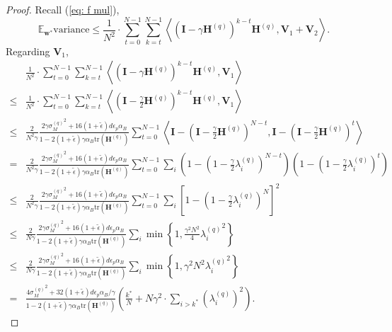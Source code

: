 \documentclass[11pt, letterpaper]{article}
\begin{document}
\begin{proof}
    Recall (\ref{eq: f mul}),
    \begin{equation*}
        \mathbb{E}_{\mathbf{w}^*}\mathrm{variance}\leq\frac{1}{N^2}\cdot\sum_{t=0}^{N-1}\sum_{k=t}^{N-1}\left\langle(\mathbf{I}-\gamma\mathbf{H}^{(q)})^{k-t}\mathbf{H}^{(q)},\mathbf{V}_1+\mathbf{V}_2\right\rangle.
    \end{equation*}
    Regarding $\mathbf{V}_1$, 
    \begin{equation}
    \label{eq: f18}
        \begin{aligned}
            &\frac{1}{N^2}\cdot\sum_{t=0}^{N-1}\sum_{k=t}^{N-1}\left\langle(\mathbf{I}-\gamma\mathbf{H}^{(q)})^{k-t}\mathbf{H}^{(q)},\mathbf{V}_1\right\rangle\\
            \leq&\frac{1}{N^2}\cdot\sum_{t=0}^{N-1}\sum_{k=t}^{N-1}\left\langle(\mathbf{I}-\frac{\gamma}{2}\mathbf{H}^{(q)})^{k-t}\mathbf{H}^{(q)},\mathbf{V}_1\right\rangle\\
            \leq&\frac{2}{N^2\gamma}\frac{2\gamma{\sigma_M^{(q)}}^2+16(1+\tilde{\epsilon}){d\epsilon_p}\alpha_B}{1-2(1+\tilde{\epsilon})\gamma\alpha_B\mathrm{tr}(\mathbf{H}^{(q)})}\sum_{t=0}^{N-1}\left\langle\mathbf{I}-(\mathbf{I}-\frac{\gamma}{2}\mathbf{H}^{(q)})^{N-t},\mathbf{I}-(\mathbf{I}-\frac{\gamma}{2} \mathbf{H}^{(q)})^{t}\right\rangle\\
            =&\frac{2}{N^2\gamma}\frac{2\gamma{\sigma_M^{(q)}}^2+16(1+\tilde{\epsilon}){d\epsilon_p}\alpha_B}{1-2(1+\tilde{\epsilon})\gamma\alpha_B\mathrm{tr}(\mathbf{H}^{(q)})}\sum_{t=0}^{N-1}\sum_i(1-(1-\frac{\gamma}{2}\lambda_i^{(q)})^{N-t})(1-(1-\frac{\gamma}{2} \lambda_i^{(q)})^{t})\\
            \leq&\frac{2}{N^2\gamma}\frac{2\gamma{\sigma_M^{(q)}}^2+16(1+\tilde{\epsilon}){d\epsilon_p}\alpha_B}{1-2(1+\tilde{\epsilon})\gamma\alpha_B\mathrm{tr}(\mathbf{H}^{(q)})}\sum_{t=0}^{N-1}\sum_i\left[1-(1-\frac{\gamma}{2}\lambda_i^{(q)})^{N}\right]^2\\
            \leq&\frac{2}{N\gamma}\frac{2\gamma{\sigma_M^{(q)}}^2+16(1+\tilde{\epsilon}){d\epsilon_p}\alpha_B}{1-2(1+\tilde{\epsilon})\gamma\alpha_B\mathrm{tr}(\mathbf{H}^{(q)})}\sum_i\min\left\{1,\frac{\gamma^2N^2}{4}{\lambda_i^{(q)}}^2\right\}\\
            \leq&\frac{2}{N\gamma}\frac{2\gamma{\sigma_M^{(q)}}^2+16(1+\tilde{\epsilon}){d\epsilon_p}\alpha_B}{1-2(1+\tilde{\epsilon})\gamma\alpha_B\mathrm{tr}(\mathbf{H}^{(q)})}\sum_i\min\left\{1,{\gamma^2N^2}{\lambda_i^{(q)}}^2\right\}\\
            =&\frac{4{\sigma_M^{(q)}}^2+32(1+\tilde{\epsilon}){d\epsilon_p}\alpha_B/\gamma}{1-2(1+\tilde{\epsilon})\gamma\alpha_B\mathrm{tr}(\mathbf{H}^{(q)})}\left(\frac{k^*}{N}+N\gamma^2\cdot\sum_{i>k^*}(\lambda_i^{(q)})^2\right).
        \end{aligned}
    \end{equation}
    

\end{proof}
\end{document}
